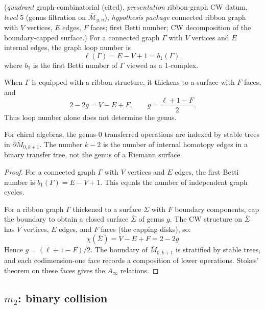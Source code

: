 \begin{theorem}
\label{thm:loop-genus-formula}
\textup{(}\emph{quadrant} graph-combinatorial \textup{(}cited\textup{)},
\emph{presentation} ribbon-graph CW datum, \emph{level} 5 \textup{(}genus
filtration on $\overline{\mathcal{M}}_{g,n}$\textup{)},
\emph{hypothesis package} connected ribbon graph with $V$ vertices,
$E$ edges, $F$ faces; first Betti number; CW decomposition of the
boundary-capped surface.\textup{)}
For a connected graph $\Gamma$ with $V$ vertices and $E$ internal edges,
the graph loop number is
\[
\ell(\Gamma) = E - V + 1 = b_1(\Gamma).
\]
where $b_1$ is the first Betti number of $\Gamma$ viewed as a 1-complex.

When $\Gamma$ is equipped with a ribbon structure, it thickens to a
surface with $F$ faces, and
\[
2-2g=V-E+F,\qquad
g=\frac{\ell+1-F}{2}.
\]
Thus loop number alone does not determine the genus.

For chiral algebras, the genus-$0$ transferred operations are indexed
by stable trees in $\partial\overline{M}_{0,k+1}$.  The number
$k-2$ is the number of internal homotopy edges in a binary transfer
tree, not the genus of a Riemann surface.
\end{theorem}

\begin{proof}
For a connected graph $\Gamma$ with $V$ vertices and $E$ edges,
the first Betti number is $b_1(\Gamma) = E - V + 1$. This equals the
number of independent graph cycles.

For a ribbon graph $\Gamma$ thickened to a surface $\Sigma$ with $F$ boundary components, cap the boundary to obtain a closed surface $\bar{\Sigma}$ of genus $g$. The CW structure on $\bar{\Sigma}$ has $V$ vertices, $E$ edges, and $F$ faces (the capping disks), so:
\[\chi(\bar{\Sigma}) = V - E + F = 2 - 2g\]
Hence $g=(\ell+1-F)/2$.  The boundary of
$\overline{M}_{0,k+1}$ is stratified by stable trees, and each
codimension-one face records a composition of lower operations.  Stokes'
theorem on these faces gives the $A_\infty$ relations.
\end{proof}

\subsection{\texorpdfstring{$m_2$: binary collision}{m 2: binary collision}}

